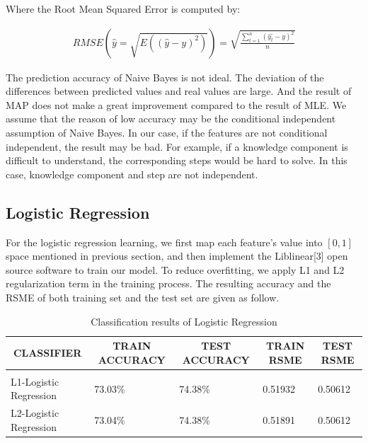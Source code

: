 \documentclass{article} %
\begin{document}
Where the Root Mean Squared Error is computed by: 

\begin{equation}
\begin{aligned}
RMSE(\hat{y}=\sqrt{E((\hat{y}-y)^2)})=\sqrt{\frac{\sum_{t=1}^{n}(\hat{y_t}-y)^2}{n}}
\end{aligned}
\end{equation}

The prediction accuracy of Naive Bayes is not ideal. The deviation of the differences between predicted values and real values are large. And the result of MAP does not make a great improvement compared to the result of MLE. We assume that the reason of low accuracy may be the conditional independent assumption of Naive Bayes. In our case, if the features are not conditional independent, the result may be bad. For example, if a knowledge component is difficult to understand, the corresponding steps would be hard to solve. In this case, knowledge component and step are not independent. 

\subsection{Logistic Regression}
For the logistic regression learning, we first map each feature's value into $[0,1]$ space mentioned in previous section, and then implement the Liblinear[3] open source software to train our model. To reduce overfitting, we apply L1 and L2 regularization term in the training process. The resulting accuracy and the RSME of both training set and the test set are given as follow. 

\begin{table}[h]
\caption{Classification results of Logistic Regression}
\label{sample-table}
\begin{center}
\begin{tabular}{lllll}
\multicolumn{1}{c}{\bf CLASSIFIER}  &\multicolumn{1}{c}{\bf TRAIN ACCURACY}  &\multicolumn{1}{c}{\bf TEST ACCURACY} &\multicolumn{1}{c}{\bf TRAIN RSME} &\multicolumn{1}{c}{\bf TEST RSME}
\\ \hline \\
L1-Logistic Regression	&73.03\%  &74.38\% &0.51932 &0.50612\\
L2-Logistic Regression         &73.04\%  &74.38\% &0.51891 &0.50612\\

\end{tabular}
\end{center}
\end{table}
\end{document}
